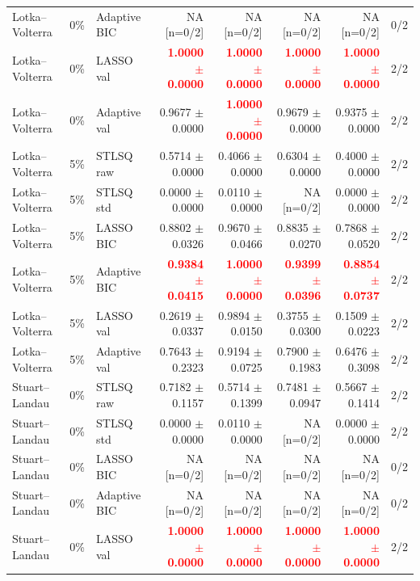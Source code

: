 \documentclass{article}
\begin{document}
\begin{longtable}{lllrrrrr}
Lotka--Volterra & 0\% & Adaptive BIC & NA [n=0/2] & NA [n=0/2] & NA [n=0/2] & NA [n=0/2] & 0/2 \\
Lotka--Volterra & 0\% & LASSO val & \textcolor{red}{\textbf{1.0000 $\pm$ 0.0000}} & \textcolor{red}{\textbf{1.0000 $\pm$ 0.0000}} & \textcolor{red}{\textbf{1.0000 $\pm$ 0.0000}} & \textcolor{red}{\textbf{1.0000 $\pm$ 0.0000}} & 2/2 \\
Lotka--Volterra & 0\% & Adaptive val & 0.9677 $\pm$ 0.0000 & \textcolor{red}{\textbf{1.0000 $\pm$ 0.0000}} & 0.9679 $\pm$ 0.0000 & 0.9375 $\pm$ 0.0000 & 2/2 \\
\midrule
Lotka--Volterra & 5\% & STLSQ raw & 0.5714 $\pm$ 0.0000 & 0.4066 $\pm$ 0.0000 & 0.6304 $\pm$ 0.0000 & 0.4000 $\pm$ 0.0000 & 2/2 \\
Lotka--Volterra & 5\% & STLSQ std & 0.0000 $\pm$ 0.0000 & 0.0110 $\pm$ 0.0000 & NA [n=0/2] & 0.0000 $\pm$ 0.0000 & 2/2 \\
Lotka--Volterra & 5\% & LASSO BIC & 0.8802 $\pm$ 0.0326 & 0.9670 $\pm$ 0.0466 & 0.8835 $\pm$ 0.0270 & 0.7868 $\pm$ 0.0520 & 2/2 \\
Lotka--Volterra & 5\% & Adaptive BIC & \textcolor{red}{\textbf{0.9384 $\pm$ 0.0415}} & \textcolor{red}{\textbf{1.0000 $\pm$ 0.0000}} & \textcolor{red}{\textbf{0.9399 $\pm$ 0.0396}} & \textcolor{red}{\textbf{0.8854 $\pm$ 0.0737}} & 2/2 \\
Lotka--Volterra & 5\% & LASSO val & 0.2619 $\pm$ 0.0337 & 0.9894 $\pm$ 0.0150 & 0.3755 $\pm$ 0.0300 & 0.1509 $\pm$ 0.0223 & 2/2 \\
Lotka--Volterra & 5\% & Adaptive val & 0.7643 $\pm$ 0.2323 & 0.9194 $\pm$ 0.0725 & 0.7900 $\pm$ 0.1983 & 0.6476 $\pm$ 0.3098 & 2/2 \\
\midrule
Stuart--Landau & 0\% & STLSQ raw & 0.7182 $\pm$ 0.1157 & 0.5714 $\pm$ 0.1399 & 0.7481 $\pm$ 0.0947 & 0.5667 $\pm$ 0.1414 & 2/2 \\
Stuart--Landau & 0\% & STLSQ std & 0.0000 $\pm$ 0.0000 & 0.0110 $\pm$ 0.0000 & NA [n=0/2] & 0.0000 $\pm$ 0.0000 & 2/2 \\
Stuart--Landau & 0\% & LASSO BIC & NA [n=0/2] & NA [n=0/2] & NA [n=0/2] & NA [n=0/2] & 0/2 \\
Stuart--Landau & 0\% & Adaptive BIC & NA [n=0/2] & NA [n=0/2] & NA [n=0/2] & NA [n=0/2] & 0/2 \\
Stuart--Landau & 0\% & LASSO val & \textcolor{red}{\textbf{1.0000 $\pm$ 0.0000}} & \textcolor{red}{\textbf{1.0000 $\pm$ 0.0000}} & \textcolor{red}{\textbf{1.0000 $\pm$ 0.0000}} & \textcolor{red}{\textbf{1.0000 $\pm$ 0.0000}} & 2/2 \\

\end{longtable}
\end{document}
